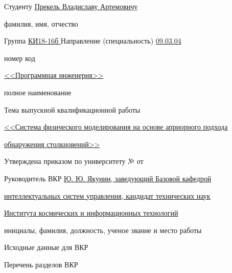 \begin{spacing}{1}{
        \setlength{\parindent}{0cm}

        Студенту \uline{\hfill Прекель Владиславу Артемовичу \hfill}

        \vspace{-4pt}
        {\footnotesize\hfill фамилия, имя, отчество \hfill}

        Группа \uline{\hfill КИ18-16б \hfill} Направление (специальность) \uline{\hfill\hfill 09.03.04 \hfill\hfill}

        \vspace{-4pt}
        {\footnotesize {\normalsize\hspace{8ex}} \hfill номер \hfill {\normalsize\hspace{32ex}} \hfill\hfill код \hfill\hfill}

        \uline{\hfill <<Программная инженерия>> \hfill}

        \vspace{-4pt}
        {\footnotesize  \hfill полное наименование \hfill}

        Тема выпускной квалификационной работы \uline{\hfill}

        \uline{\hfill<<Система физического моделирования на основе априорного подхода\hfill}

        \uline{\hfill обнаружения столкновений>>\hfill}

        Утверждена приказом по университету № \uline{\hfill} от \uline{\hfill\hfill\hfill}

        Руководитель ВКР \uline{\hfill Ю. Ю. Якунин, заведующий Базовой кафедрой \hfill}

        \uline{\hfill интеллектуальных систем управления, кандидат технических наук \hfill}

        \uline{\hfill Института космических и информационных технологий \hfill}

        \vspace{-4pt}
        {\footnotesize \hfill инициалы, фамилия, должность, ученое звание и место работы \hfill}

        Исходные данные для ВКР \uline{\hfill}

        \uline{\hfill}

        \uline{\hfill}

        Перечень разделов ВКР \uline{\hfill}

        \uline{\hfill}

        \uline{\hfill}

}
\end{spacing}
